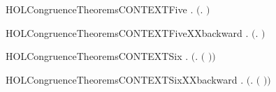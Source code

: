 \newcommand{\HOLCongruenceTheoremsCONTEXTFourXXbackward}{\UseVerbatim{HOLCongruenceTheoremsCONTEXTFourXXbackward}}
\begin{SaveVerbatim}{HOLCongruenceTheoremsCONTEXTFive}
\HOLTokenTurnstile{} \HOLSymConst{\HOLTokenForall{}} .   \HOLSymConst{\HOLTokenConj{}}   \HOLSymConst{\HOLTokenImp{}}  \ensuremath{(}\HOLTokenLambda{}.   \HOLSymConst{\ensuremath{\mid}}  \ensuremath{)}
\end{SaveVerbatim}
\newcommand{\HOLCongruenceTheoremsCONTEXTFive}{\UseVerbatim{HOLCongruenceTheoremsCONTEXTFive}}
\begin{SaveVerbatim}{HOLCongruenceTheoremsCONTEXTFiveXXbackward}
\HOLTokenTurnstile{} \HOLSymConst{\HOLTokenForall{}} .  \ensuremath{(}\HOLTokenLambda{}.   \HOLSymConst{\ensuremath{\mid}}  \ensuremath{)} \HOLSymConst{\HOLTokenImp{}}   \HOLSymConst{\HOLTokenConj{}}  
\end{SaveVerbatim}
\newcommand{\HOLCongruenceTheoremsCONTEXTFiveXXbackward}{\UseVerbatim{HOLCongruenceTheoremsCONTEXTFiveXXbackward}}
\begin{SaveVerbatim}{HOLCongruenceTheoremsCONTEXTSix}
\HOLTokenTurnstile{} \HOLSymConst{\HOLTokenForall{}} .   \HOLSymConst{\HOLTokenImp{}}  \ensuremath{(}\HOLTokenLambda{}.   \ensuremath{(} \ensuremath{)}\ensuremath{)}
\end{SaveVerbatim}
\newcommand{\HOLCongruenceTheoremsCONTEXTSix}{\UseVerbatim{HOLCongruenceTheoremsCONTEXTSix}}
\begin{SaveVerbatim}{HOLCongruenceTheoremsCONTEXTSixXXbackward}
\HOLTokenTurnstile{} \HOLSymConst{\HOLTokenForall{}} .  \ensuremath{(}\HOLTokenLambda{}.   \ensuremath{(} \ensuremath{)}\ensuremath{)} \HOLSymConst{\HOLTokenImp{}}  
\end{SaveVerbatim}
\newcommand{\HOLCongruenceTheoremsCONTEXTSixXXbackward}{\UseVerbatim{HOLCongruenceTheoremsCONTEXTSixXXbackward}}

